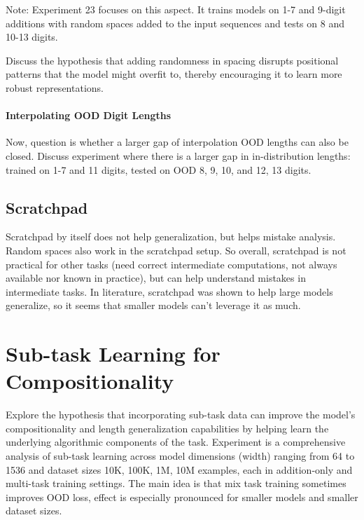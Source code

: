Note: Experiment 23 focuses on this aspect. It trains models on 1-7 and 9-digit additions with random spaces added to the input sequences and tests on 8 and 10-13 digits.

Discuss the hypothesis that adding randomness in spacing disrupts positional patterns that the model might overfit to, thereby encouraging it to learn more robust representations.

\paragraph{Interpolating OOD Digit Lengths}
Now, question is whether a larger gap of interpolation OOD lengths can also be closed. Discuss experiment where there is a larger gap in in-distribution lengths: trained on 1-7 and 11 digits, tested on OOD 8, 9, 10, and 12, 13 digits.

\label{fig:larger_gap}


\subsection{Scratchpad}
Scratchpad by itself does not help generalization, but helps mistake analysis. Random spaces also work in the scratchpad setup. So overall, scratchpad is not practical for other tasks (need correct intermediate computations, not always available nor known in practice), but can help understand mistakes in intermediate tasks. In literature, scratchpad was shown to help large models generalize, so it seems that smaller models can't leverage it as much.

\label{fig:scratchpad_eval}


\section{Sub-task Learning for Compositionality}\label{sec:subtask_learning}
Explore the hypothesis that incorporating sub-task data can improve the model's compositionality and length generalization capabilities by helping learn the underlying algorithmic components of the task.
Experiment is a comprehensive analysis of sub-task learning across model dimensions (width) ranging from 64 to 1536 and dataset sizes 10K, 100K, 1M, 10M examples, each in addition-only and multi-task training settings. The main idea is that mix task training sometimes improves OOD loss, effect is especially pronounced for smaller models and smaller dataset sizes.


